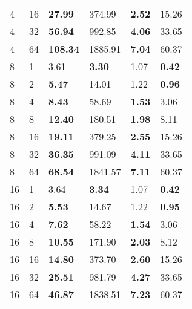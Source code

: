 \begin{table}[!ht]
\begin{tabular}{@{}llllll@{}}
		4 & 16 & \textbf{27.99} & 374.99 & \textbf{2.52} & 15.26 \\ 
		4 & 32 & \textbf{56.94} & 992.85 & \textbf{4.06} & 33.65 \\ 
		4 & 64 & \textbf{108.34} & 1885.91 & \textbf{7.04} & 60.37 \\ \midrule
		8 & 1 & 3.61 & \textbf{3.30} & 1.07 & \textbf{0.42} \\ 
		8 & 2 & \textbf{5.47} & 14.01 & 1.22 & \textbf{0.96} \\ 
		8 & 4 & \textbf{8.43} & 58.69 & \textbf{1.53} & 3.06 \\ 
		8 & 8 & \textbf{12.40} & 180.51 & \textbf{1.98} & 8.11 \\ 
		8 & 16 & \textbf{19.11} & 379.25 & \textbf{2.55} & 15.26 \\ 
		8 & 32 & \textbf{36.35} & 991.09 & \textbf{4.11} & 33.65 \\ 
		8 & 64 & \textbf{68.54} & 1841.57 & \textbf{7.11} & 60.37 \\ \midrule
		16 & 1 & 3.64 & \textbf{3.34} & 1.07 & \textbf{0.42} \\ 
		16 & 2 & \textbf{5.53} & 14.67 & 1.22 & \textbf{0.95} \\ 
		16 & 4 & \textbf{7.62} & 58.22 & \textbf{1.54} & 3.06 \\ 
		16 & 8 & \textbf{10.55} & 171.90 & \textbf{2.03} & 8.12 \\ 
		16 & 16 & \textbf{14.80} & 373.70 & \textbf{2.60} & 15.26 \\ 
		16 & 32 & \textbf{25.51} & 981.79 & \textbf{4.27} & 33.65 \\ 
		16 & 64 & \textbf{46.87} & 1838.51 & \textbf{7.23} & 60.37 \\ \bottomrule
	\end{tabular}
\end{table}